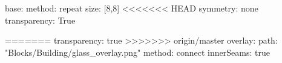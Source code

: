 base:
  method: repeat
  size: [8,8]
<<<<<<< HEAD
  symmetry: none
  transparency: True

=======
  transparency: true
>>>>>>> origin/master
overlay:
  path: "Blocks/Building/glass_overlay.png"
  method: connect
  innerSeams: true
